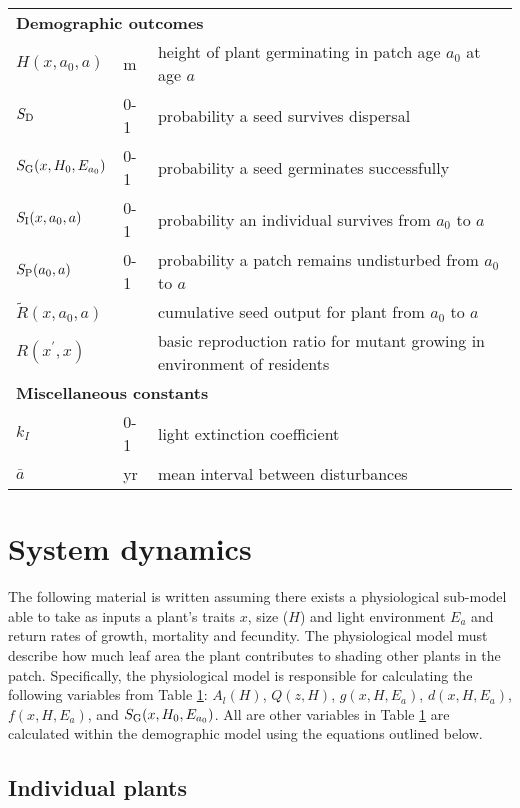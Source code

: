 \documentclass[10pt,twoside]{article}
\begin{document}
\begin{table}[ht]
\begin{tabular}{p{2cm}p{2cm}p{9cm}}
  \multicolumn{3}{l}{\textbf{Demographic outcomes}} \\
  $H(x, a_0, a)$   & m  & height of plant germinating in patch age $a_0$ at age $a$\\
  $S_{\rm D}$ & 0-1 & probability a seed survives dispersal \\
  $S_{\rm G} (x, H_0, E_{a_0})$ & 0-1 & probability a seed germinates successfully \\
  $S_{\rm I} (x, a_0, a)$ & 0-1 & probability an individual survives from $a_0$ to $a$\\
  $S_{\rm P} ( a_0, a)$ & 0-1 & probability a patch remains undisturbed from $a_0$ to $a$\\
  $\tilde{R}(x, a_0, a)$ & & cumulative seed output for plant from $a_0$ to $a$ \\
  $R\left(x^\prime, x\right)$ & & basic reproduction ratio for mutant growing in environment of residents \\

  \multicolumn{3}{l}{\textbf{Miscellaneous constants}} \\
  $k_I$ & 0-1  & light extinction coefficient\\
  $\bar{a}$ & yr & mean interval between disturbances \\
  \hline
  \end{tabular}
\label{tab:definitions}
\end{table}

\clearpage

\section{System dynamics}\label{system-dynamics}

The following material is written assuming there exists a physiological sub-model
able to take as inputs a plant's traits $x$, size ($H$) and light environment $E_a$
and return rates of growth, mortality and fecundity. The physiological model must
describe how much leaf area the plant contributes to shading other plants in the patch.
Specifically, the physiological model is responsible for calculating the following
variables from Table \ref{tab:definitions}:
$A_l(H)$, $Q(z, H)$, $g(x, H, E_a)$, $d(x, H, E_a)$, $f(x, H, E_a)$, and
$S_{\rm G} (x, H_0, E_{a_0})$.
All are other variables in Table \ref{tab:definitions} are calculated within the
demographic model using the equations outlined below.

\subsection{Individual plants}\label{individual-plants}
\end{document}
